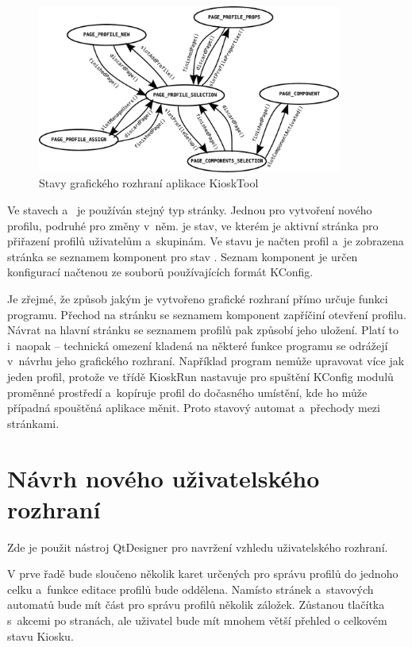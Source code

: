 \begin{figure}[h]
    \centering
    \includegraphics[width=10cm]{obrazky/stated.pdf}
    \caption{Stavy grafického rozhraní aplikace KioskTool}
    \label{fig:kioskstates}
\end{figure}

Ve stavech  a~ je používán stejný typ stránky. Jednou pro vytvoření nového profilu, podruhé pro změny v~něm.\linebreak {} je stav, ve kterém je aktivní stránka pro přiřazení profilů uživatelům a~skupinám. Ve stavu  je načten profil a~je zobrazena stránka se seznamem komponent pro stav . Seznam komponent je určen konfigurací načtenou ze souborů používajících formát KConfig.

Je zřejmé, že způsob jakým je vytvořeno grafické rozhraní přímo určuje funkci programu. Přechod na stránku se seznamem komponent zapříčiní otevření profilu. Návrat na hlavní stránku se seznamem profilů pak způsobí jeho uložení. Platí to i~naopak -- technická omezení kladená na některé funkce programu se odrážejí v~návrhu jeho grafického rozhraní. Například program nemůže upravovat více jak jeden profil, protože ve třídě KioskRun nastavuje pro spuštění KConfig modulů proměnné prostředí a~kopíruje profil do dočasného umístění, kde ho může případná spouštěná aplikace měnit. Proto stavový automat a~přechody mezi stránkami.

\section{Návrh nového uživatelského rozhraní}
Zde je použit nástroj QtDesigner pro navržení vzhledu uživatelského rozhraní.

V prve řadě bude sloučeno několik karet určených pro správu profilů do jednoho celku a~funkce editace profilů bude oddělena. Namísto stránek a~stavových automatů bude mít část pro správu profilů několik záložek. Zůstanou tlačítka s~akcemi po stranách, ale uživatel bude mít mnohem větší přehled o celkovém stavu Kiosku.

